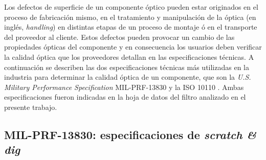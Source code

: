 Los defectos de superficie de un componente óptico pueden estar originados en el proceso de fabricación mismo, en el tratamiento y manipulación de la óptica (en inglés, \textit{handling}) en distintas etapas de un proceso de montaje ó en el transporte del proveedor al cliente. Estos defectos pueden provocar un cambio de las propiedades ópticas del componente y en consecuencia los usuarios deben verificar la calidad óptica que los proveedores detallan en las especificaciones técnicas. A continuación se describen las dos especificaciones técnicas más utilizadas en la industria para determinar la calidad óptica de un componente, que son la \textit{U.S. Military Performance Specification} MIL-PRF-13830 y la ISO 10110 \cite{milprf}\cite{iso10110}. Ambas especificaciones fueron indicadas en la hoja de datos del filtro analizado en el presente trabajo.

\singlespacing
\subsection{MIL-PRF-13830: especificaciones de \textit{scratch \& dig}}
\label{sec:scanddig}

